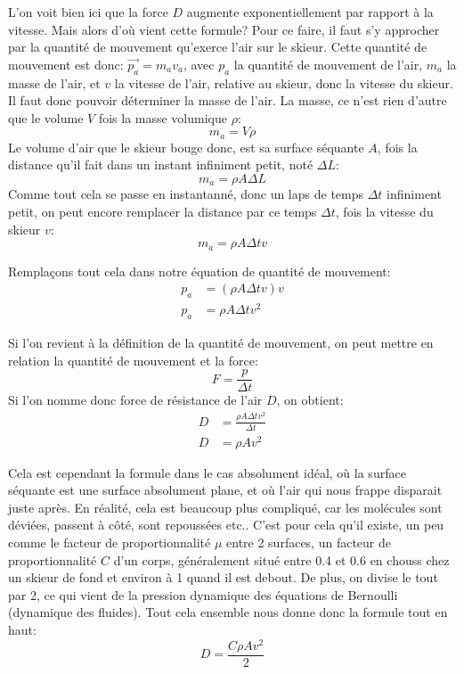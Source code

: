 \documentclass{article}
\begin{document}
L'on voit bien ici que la force $D$ augmente exponentiellement par rapport à la vitesse. 
Mais alors d'où vient cette formule? Pour ce faire, il faut s'y approcher par la quantité de mouvement qu'exerce l'air sur le skieur. Cette quantité de mouvement est donc: $\vec{p_a} = m_{a}v_{a}$, avec $p_a$ la quantité de mouvement de l'air, $m_a$ la masse de l'air, et $v$ la vitesse de l'air, relative au skieur, donc la vitesse du skieur. Il faut donc pouvoir déterminer la masse de l'air. La masse, ce n'est rien d'autre que le volume $V$ fois la masse volumique $\rho$:
$$m_a = V\rho$$
Le volume d'air que le skieur bouge donc, est sa surface séquante $A$, fois la distance qu'il fait dans un instant infiniment petit, noté $\Delta L$:
$$m_a = \rho A \Delta{L}$$
Comme tout cela se passe en instantanné, donc un laps de temps $\Delta t$ infiniment petit, on peut encore remplacer la distance par ce temps $\Delta{t}$, fois la vitesse du skieur $v$:
$$m_a = \rho A \Delta{t} v$$

Remplaçons tout cela dans notre équation de quantité de mouvement:
\begin{align}
    \nonumber
    p_a &= (\rho A \Delta{t} v)v \\
    p_a &= \rho A \Delta{t} v^2
\end{align}

Si l'on revient à la définition de la quantité de mouvement, on peut mettre en relation la quantité de mouvement et la force:
$$F=\frac{p}{\Delta t}$$
Si l'on nomme donc force de résistance de l'air $D$, on obtient:
\begin{align}
    \nonumber
    D &= \frac{\rho A \Delta{t} v^2}{\Delta{t}} \\
    \label{drag_perf-cond}
    D &= \rho A v^2
\end{align}

Cela est cependant la formule dans le cas absolument idéal, où la surface séquante est une surface absolument plane, et où l'air qui nous frappe disparait juste après. En réalité, cela est beaucoup plus compliqué, car les molécules sont déviées, passent à côté, sont repoussées etc.. C'est pour cela qu'il existe, un peu comme le facteur de proportionnalité $\mu$ entre 2 surfaces, un facteur de proportionnalité $C$ d'un corps, généralement situé entre 0.4 et 0.6 en chouss chez un skieur de fond et environ à 1 quand il est debout. 
\newline De plus, on divise le tout par 2, ce qui vient de la pression dynamique des équations de Bernoulli (dynamique des fluides). Tout cela ensemble nous donne donc la formule tout en haut:
$$D = \frac{C \rho A v^2}{2}$$
\end{document}
